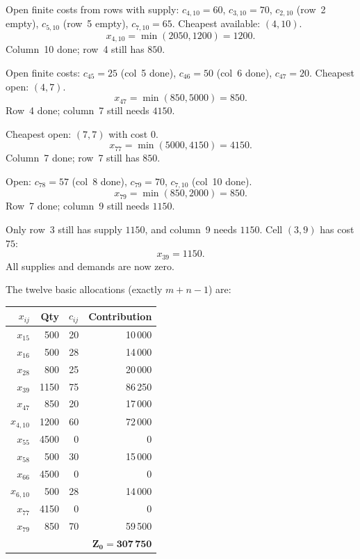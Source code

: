 Open finite costs from rows with supply: \(c_{4,10}=60\), \(c_{3,10}=70\), \(c_{2,10}\) (row~2 empty),
\(c_{5,10}\) (row~5 empty), \(c_{7,10}=65\). Cheapest available: \((4,10)\).
\[
  x_{4,10}=\min(2050,1200)=1200.
\]
Column~10 done; row~4 still has \(850\).

Open finite costs: \(c_{45}=25\) (col~5 done), \(c_{46}=50\) (col~6 done), \(c_{47}=20\).
Cheapest open: \((4,7)\).
\[
  x_{47}=\min(850,5000)=850.
\]
Row~4 done; column~7 still needs \(4150\).

Cheapest open: \((7,7)\) with cost \(0\).
\[
  x_{77}=\min(5000,4150)=4150.
\]
Column~7 done; row~7 still has \(850\).

Open: \(c_{78}=57\) (col~8 done), \(c_{79}=70\), \(c_{7,10}\) (col~10 done).
\[
  x_{79}=\min(850,2000)=850.
\]
Row~7 done; column~9 still needs \(1150\).

Only row~3 still has supply \(1150\), and column~9 needs \(1150\). Cell \((3,9)\) has cost \(75\):
\[
  x_{39}=1150.
\]
All supplies and demands are now zero.

The twelve basic allocations (exactly \(m+n-1\)) are:
\begin{center}
\begin{tabular}{@{}rrrr@{}}
\toprule
\(x_{ij}\) & Qty & \(c_{ij}\) & Contribution \\
\midrule
\(x_{15}\) & 500 & 20 & 10\,000 \\
\(x_{16}\) & 500 & 28 & 14\,000 \\
\(x_{28}\) & 800 & 25 & 20\,000 \\
\(x_{39}\) & 1150 & 75 & 86\,250 \\
\(x_{47}\) & 850 & 20 & 17\,000 \\
\(x_{4,10}\) & 1200 & 60 & 72\,000 \\
\(x_{55}\) & 4500 & 0 & 0 \\
\(x_{58}\) & 500 & 30 & 15\,000 \\
\(x_{66}\) & 4500 & 0 & 0 \\
\(x_{6,10}\) & 500 & 28 & 14\,000 \\
\(x_{77}\) & 4150 & 0 & 0 \\
\(x_{79}\) & 850 & 70 & 59\,500 \\
\midrule
 & & & \(\mathbf{Z_0=307\,750}\) \\
\bottomrule
\end{tabular}
\end{center}

